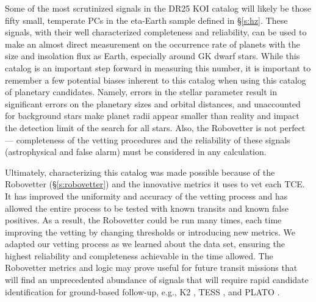 Some of the most scrutinized signals in the DR25 KOI catalog will likely be those fifty small, temperate PCs in the eta-Earth sample defined in \S\ref{s:hz}.  These signals, with their well characterized completeness and reliability, can be used to make an almost direct measurement on the occurrence rate of planets with the size and insolation flux as Earth, especially around GK dwarf stars.  While this catalog is an important step forward in measuring this number, it is important to remember a few potential biases inherent to this catalog when using this catalog of planetary candidates. Namely, errors in the stellar parameter result in significant errors on the planetary sizes and orbital distances, and unaccounted for background stars make planet radii appear smaller than reality and impact the detection limit of the search for all stars.  Also, the Robovetter is not perfect --- completeness of the vetting procedures and the reliability of these signals (astrophysical and false alarm) must be considered in any calculation.


Ultimately, characterizing this catalog was made possible because of the Robovetter (\S\ref{s:robovetter}) and the innovative metrics it uses to vet each TCE. It has improved the uniformity and accuracy of the vetting process and has allowed the entire process to be tested with known transits and known false positives. As a result, the Robovetter could be run many times, each time improving the vetting by changing thresholds or introducing new metrics. We adapted our vetting process as we learned about the data set, ensuring the highest reliability and completeness achievable in the time allowed.  The Robovetter metrics and logic may prove useful for future transit missions that will find an unprecedented abundance of signals that will require rapid candidate identification for ground-based follow-up, e.g., K2 \citep{Howell2014}, TESS \citep{Ricker2015}, and PLATO \citep{Rauer2016}.  


